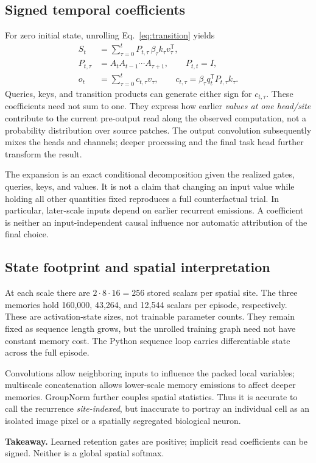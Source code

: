 \documentclass[10pt,letterpaper]{article}
\newcommand{\takeaway}[1]{\par\smallskip\noindent\textbf{Takeaway.} #1}
\begin{document}
\subsection{Signed temporal coefficients}
For zero initial state, unrolling Eq.~\eqref{eq:transition} yields
\begin{align}
S_t&=\sum_{\tau=0}^{t}P_{t,\tau}\,\beta_\tau k_\tau v_\tau^{\mathsf T},\\
P_{t,\tau}&=A_tA_{t-1}\cdots A_{\tau+1},\qquad P_{t,t}=I,\\
o_t&=\sum_{\tau=0}^{t}c_{t,\tau}v_\tau,\qquad
c_{t,\tau}=\beta_\tau q_t^{\mathsf T}P_{t,\tau}k_\tau.\label{eq:coeff}
\end{align}
Queries, keys, and transition products can generate either sign for $c_{t,\tau}$. These coefficients need not sum to one. They express how earlier \emph{values at one head/site} contribute to the current pre-output read along the observed computation, not a probability distribution over source patches. The output convolution subsequently mixes the heads and channels; deeper processing and the final task head further transform the result.

The expansion is an exact conditional decomposition given the realized gates, queries, keys, and values. It is not a claim that changing an input value while holding all other quantities fixed reproduces a full counterfactual trial. In particular, later-scale inputs depend on earlier recurrent emissions. A coefficient is neither an input-independent causal influence nor automatic attribution of the final choice.

\subsection{State footprint and spatial interpretation}
At each scale there are $2\cdot8\cdot16=256$ stored scalars per spatial site. The three memories hold 160,000, 43,264, and 12,544 scalars per episode, respectively. These are activation-state sizes, not trainable parameter counts. They remain fixed as sequence length grows, but the unrolled training graph need not have constant memory cost. The Python sequence loop carries differentiable state across the full episode.

Convolutions allow neighboring inputs to influence the packed local variables; multiscale concatenation allows lower-scale memory emissions to affect deeper memories. GroupNorm further couples spatial statistics. Thus it is accurate to call the recurrence \emph{site-indexed}, but inaccurate to portray an individual cell as an isolated image pixel or a spatially segregated biological neuron.
\takeaway{Learned retention gates are positive; implicit read coefficients can be signed. Neither is a global spatial softmax.}
\end{document}
